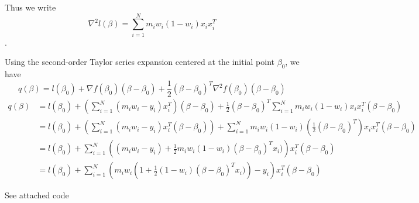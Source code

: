 \documentclass[12pt]{article}
\newenvironment{problem}[2][Exercise]{\begin{trivlist}
\item[\hskip \labelsep {\bfseries #1}\hskip \labelsep {\bfseries #2.}]}{\end{trivlist}}
\begin{document}
\begin{problem}{C}
Thus we write $$\nabla^2 l (\beta) = \sum_{i=1}^N m_iw_i(1-w_i)x_ix_i^T$$.


Using the second-order Taylor series expansion centered at the initial point $\beta_0$, we have
$$q(\beta) = l(\beta_0) + \nabla f(\beta_0)(\beta - \beta_0) + \frac{1}{2} (\beta - \beta_0)^T \nabla^2 f(\beta_0)(\beta - \beta_0)$$
\begin{align*}
q(\beta) &= l(\beta_0) +\left( \sum_{i=1}^N (m_iw_i - y_i)x_i^T \right)(\beta - \beta_0) + \frac{1}{2}(\beta - \beta_0)^T\sum_{i=1}^Nm_iw_i(1-w_i)x_ix_i^T(\beta - \beta_0)\\
&= l(\beta_0) +\left( \sum_{i=1}^N (m_iw_i - y_i)x_i^T(\beta - \beta_0) \right) + \sum_{i=1}^Nm_iw_i(1-w_i)(\frac{1}{2}(\beta - \beta_0)^T)x_ix_i^T(\beta - \beta_0)\\
&= l(\beta_0) + \sum_{i=1}^N \left((m_iw_i - y_i) + \frac{1}{2}m_iw_i(1-w_i)(\beta - \beta_0)^Tx_i) \right)x_i^T(\beta - \beta_0)\\
&= l(\beta_0) + \sum_{i=1}^N \left( m_iw_i\left(1  + \frac{1}{2}(1-w_i)(\beta - \beta_0)^Tx_i)\right) - y_i \right)x_i^T(\beta - \beta_0)
\end{align*}
\end{problem}

\begin{problem}{D}
See attached code
\end{problem}

\begin{problem}{E}

\end{problem}
\end{document}
